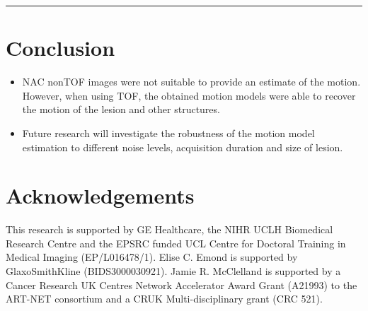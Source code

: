 \documentclass[portrait,color=UCLburgundy,margin=2cm]{uclposter}
\begin{document}
\vspace{-2.0cm}

\rule{1\hsize}{0.1cm}

\vspace{-1.0cm}

\begin{multicols}{2}
\normalsize

\section*{Conclusion}
\begin{itemize}
    \item NAC nonTOF images were not suitable to provide an estimate of the motion. However, when using TOF, the obtained motion models were able to recover the motion of the lesion and other structures.
    \item Future research will investigate the robustness of the motion model estimation to different noise levels, acquisition duration and size of lesion.
\end{itemize}

\AtNextBibliography{\small}
\printbibliography

\small
\section*{Acknowledgements}
This research is supported by GE Healthcare, the NIHR UCLH Biomedical Research Centre and the EPSRC funded UCL Centre for Doctoral Training in Medical Imaging (EP/L016478/1). Elise C. Emond is supported by GlaxoSmithKline (BIDS3000030921). Jamie R. McClelland is supported by a Cancer Research UK Centres Network Accelerator Award Grant (A21993) to the ART-NET consortium and a CRUK Multi-disciplinary grant (CRC 521).

\end{multicols}
\end{document}
